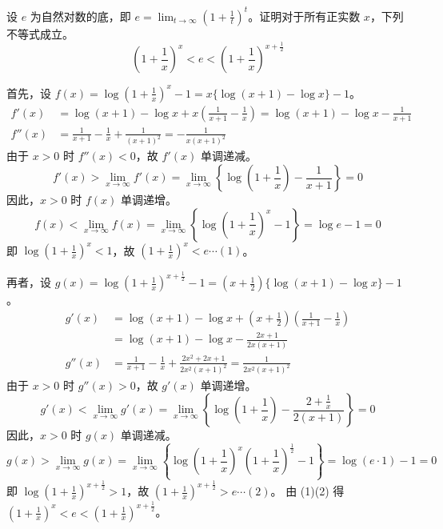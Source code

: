 \begin{questions}
\question
设 $e$ 为自然对数的底，即 $e = \lim_{t \to \infty} \left(1 + \frac{1}{t}\right)^t$。证明对于所有正实数 $x$，下列不等式成立。
\[
\left(1 + \frac{1}{x}\right)^x < e < \left(1 + \frac{1}{x}\right)^{x + \frac{1}{2}}
\]
\begin{solution}
    首先，设 $f(x) = \log\left(1 + \frac{1}{x}\right)^x - 1 = x\{\log(x+1) - \log x\} - 1$。
    \begin{align*}
    f'(x) &= \log(x+1) - \log x + x\left(\frac{1}{x+1} - \frac{1}{x}\right) = \log(x+1) - \log x - \frac{1}{x+1} \\
    f''(x) &= \frac{1}{x+1} - \frac{1}{x} + \frac{1}{(x+1)^2} = -\frac{1}{x(x+1)^2}
    \end{align*}
    由于 $x > 0$ 时 $f''(x) < 0$，故 $f'(x)$ 单调递减。
    \[
    f'(x) > \lim_{x \to \infty} f'(x) = \lim_{x \to \infty} \left\{ \log\left(1 + \frac{1}{x}\right) - \frac{1}{x+1} \right\} = 0
    \]
    因此，$x > 0$ 时 $f(x)$ 单调递增。
    \[
    f(x) < \lim_{x \to \infty} f(x) = \lim_{x \to \infty} \left\{ \log\left(1 + \frac{1}{x}\right)^x - 1 \right\} = \log e - 1 = 0
    \]
    即 $\log\left(1 + \frac{1}{x}\right)^x < 1$，故 $\left(1 + \frac{1}{x}\right)^x < e \cdots (1)$。

    再者，设 $g(x) = \log\left(1 + \frac{1}{x}\right)^{x + \frac{1}{2}} - 1 = \left(x + \frac{1}{2}\right)\{\log(x+1) - \log x\} - 1$。
    \begin{align*}
    g'(x) &= \log(x+1) - \log x + \left(x + \frac{1}{2}\right)\left(\frac{1}{x+1} - \frac{1}{x}\right) \\
    &= \log(x+1) - \log x - \frac{2x+1}{2x(x+1)} \\
    g''(x) &= \frac{1}{x+1} - \frac{1}{x} + \frac{2x^2+2x+1}{2x^2(x+1)^2} = \frac{1}{2x^2(x+1)^2}
    \end{align*}
    由于 $x > 0$ 时 $g''(x) > 0$，故 $g'(x)$ 单调递增。
    \[
    g'(x) < \lim_{x \to \infty} g'(x) = \lim_{x \to \infty} \left\{ \log\left(1 + \frac{1}{x}\right) - \frac{2 + \frac{1}{x}}{2(x+1)} \right\} = 0
    \]
    因此，$x > 0$ 时 $g(x)$ 单调递减。
    \[
    g(x) > \lim_{x \to \infty} g(x) = \lim_{x \to \infty} \left\{ \log\left(1 + \frac{1}{x}\right)^x \left(1 + \frac{1}{x}\right)^{\frac{1}{2}} - 1 \right\} = \log(e \cdot 1) - 1 = 0
    \]
    即 $\log\left(1 + \frac{1}{x}\right)^{x + \frac{1}{2}} > 1$，故 $\left(1 + \frac{1}{x}\right)^{x + \frac{1}{2}} > e \cdots (2)$。
    由 (1)(2) 得 $\left(1 + \frac{1}{x}\right)^x < e < \left(1 + \frac{1}{x}\right)^{x + \frac{1}{2}}$。
\end{solution}


\end{questions}
